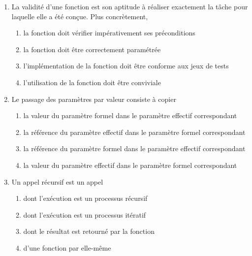 \begin{td}[QCM (3)]
\begin{enumerate}
\item La validité d'une fonction est son aptitude à réaliser exactement 
	la tâche pour laquelle elle a été conçue. Plus concrètement,
	\begin{enumerate}
	\item la fonction doit vérifier impérativement ses préconditions
	\item la fonction doit être correctement paramétrée
	\item l'implémentation de la fonction doit être conforme aux jeux de tests
	\item l'utilisation de la fonction doit être conviviale
	\end{enumerate}

\item Le passage des paramètres par valeur consiste à copier
	\begin{enumerate}
	\item la valeur du paramètre formel dans le paramètre effectif correspondant
	\item la référence du paramètre effectif dans le paramètre formel correspondant
	\item la référence du paramètre formel dans le paramètre effectif correspondant
	\item la valeur du paramètre effectif dans le paramètre formel correspondant
	\end{enumerate}
	
\item Un appel récursif est un appel 
	\begin{enumerate}
	\item dont l'exécution est un processus récursif
	\item dont l'exécution est un processus itératif
	\item dont le résultat est retourné par la fonction
	\item d'une fonction par elle-même
	\end{enumerate}	
\end{enumerate}
\end{td}


